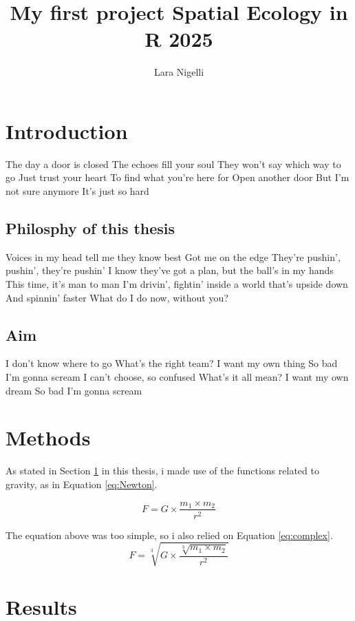 \documentclass[12pt,a4]{article}
\title{My first project Spatial Ecology in R 2025}
\author{Lara Nigelli}
\begin{document}
\maketitle

\tableofcontents

\section{Introduction} \label{sec:intro}
The day a door is closed
The echoes fill your soul
They won't say which way to go
Just trust your heart
To find what you're here for
Open another door
But I'm not sure anymore
It's just so hard

\subsection{Philosphy of this thesis}
\smallskip
\noindent Voices in my head tell me they know best
Got me on the edge
They're pushin', pushin', they're pushin'
I know they've got a plan, but the ball's in my hands
This time, it's man to man
I'm drivin', fightin' inside a world that's upside down
And spinnin' faster
What do I do now, without you?

\subsection{Aim}
\bigskip 
I don't know where to go
What's the right team?
I want my own thing
So bad I'm gonna scream
I can't choose, so confused
What's it all mean?
I want my own dream
So bad I'm gonna scream
 

\section{Methods} \label{sec:methods}
As stated in Section \ref{sec:intro}
in this thesis, i made use of the functions related to gravity, as in Equation \ref{eq:Newton}.

\begin{equation}
    F=G\times\frac{m_1\times m_2}{r^2}
    \label{eq:Newton}
\end{equation}

The equation above was too simple, so i also relied on Equation \ref{eq:complex}.
\begin{equation}
    F=\sqrt[3]{G\times\frac{\sqrt[3]{m_1\times m_2}}{r^2}}
    \label{eq:complex}
\end{equation}

\section{Results}
\end{document}
